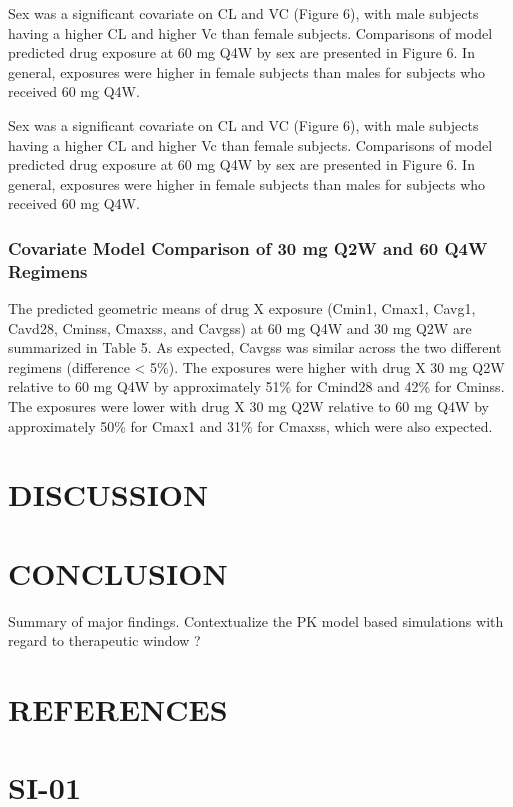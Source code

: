 \documentclass[
  letterpaper,
  toc=chapterentrywithdots,
  11pt,
  headings=small]{scrreprt}
\begin{document}
Sex was a significant covariate on CL and VC (Figure 6), with male
subjects having a higher CL and higher Vc than female subjects.
Comparisons of model predicted drug exposure at 60 mg Q4W by sex are
presented in Figure 6. In general, exposures were higher in female
subjects than males for subjects who received 60 mg Q4W.

Sex was a significant covariate on CL and VC (Figure 6), with male
subjects having a higher CL and higher Vc than female subjects.
Comparisons of model predicted drug exposure at 60 mg Q4W by sex are
presented in Figure 6. In general, exposures were higher in female
subjects than males for subjects who received 60 mg Q4W.

\subsection{Covariate Model Comparison of 30 mg Q2W and 60 Q4W
Regimens}\label{covariate-model-comparison-of-30-mg-q2w-and-60-q4w-regimens}

The predicted geometric means of drug X exposure (Cmin1, Cmax1, Cavg1,
Cavd28, Cminss, Cmaxss, and Cavgss) at 60 mg Q4W and 30 mg Q2W are
summarized in Table 5. As expected, Cavgss was similar across the two
different regimens (difference \textless{} 5\%). The exposures were
higher with drug X 30 mg Q2W relative to 60 mg Q4W by approximately 51\%
for Cmind28 and 42\% for Cminss. The exposures were lower with drug X 30
mg Q2W relative to 60 mg Q4W by approximately 50\% for Cmax1 and 31\%
for Cmaxss, which were also expected.


\chapter{DISCUSSION}\label{sec-discussion}


\chapter{CONCLUSION}\label{sec-conclusion}

Summary of major findings. Contextualize the PK model based simulations
with regard to therapeutic window ?


\chapter{REFERENCES}\label{references}


\chapter{}\label{section-1}

\cleardoublepage
{}
{}
\appendix

\chapter{SI-01}\label{si-01}
\end{document}
